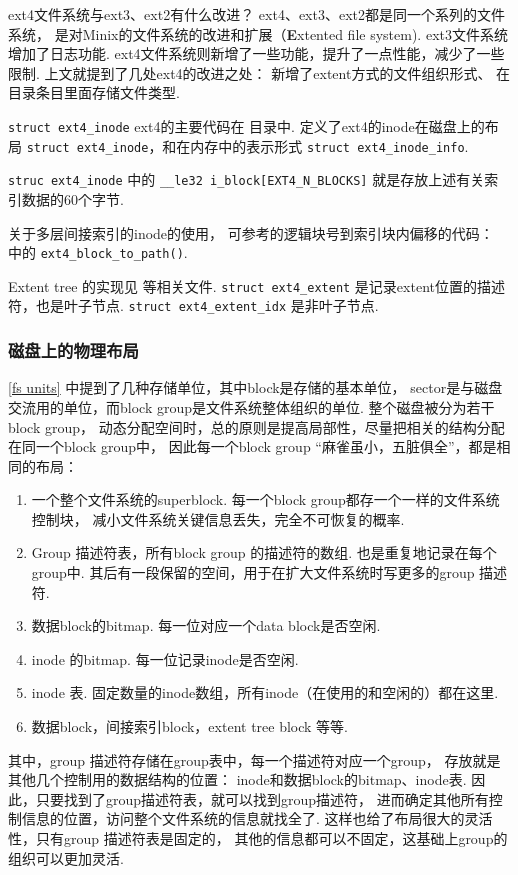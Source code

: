 \begin{qbox}{ext4文件系统与ext3、ext2有什么改进？}
	ext4、ext3、ext2都是同一个系列的文件系统，
	是对Minix的文件系统的改进和扩展（\textbf{E}xtented file system).
	ext3文件系统增加了日志功能.
	ext4文件系统则新增了一些功能，提升了一点性能，减少了一些限制.
	上文就提到了几处ext4的改进之处：
	新增了extent方式的文件组织形式、
	在目录条目里面存储文件类型.
\end{qbox}

\begin{readsrcbox}{\lstinline{struct ext4_inode}}
	ext4的主要代码在  目录中.
	 定义了ext4的inode在磁盘上的布局 \lstinline{struct ext4_inode}，和在内存中的表示形式 \lstinline{struct ext4_inode_info}.

	\lstinline{struc ext4_inode} 中的
	\lstinline{__le32 i_block[EXT4_N_BLOCKS]}
	就是存放上述有关索引数据的60个字节.

	关于多层间接索引的inode的使用，
	可参考的逻辑块号到索引块内偏移的代码：
	 中的 \lstinline{ext4_block_to_path()}.

	Extent tree 的实现见  等相关文件.
	\lstinline{struct ext4_extent} 是记录extent位置的描述符，也是叶子节点.
	\lstinline{struct ext4_extent_idx} 是非叶子节点.
\end{readsrcbox}

\subsubsection{磁盘上的物理布局}
\ref{fs units} 中提到了几种存储单位，其中block是存储的基本单位，
sector是与磁盘交流用的单位，而block group是文件系统整体组织的单位.
整个磁盘被分为若干block group，
动态分配空间时，总的原则是提高局部性，尽量把相关的结构分配在同一个block group中，
因此每一个block group “麻雀虽小，五脏俱全”，都是相同的布局\cite{ext4high}：
\begin{enumerate}
	\item 一个整个文件系统的superblock. 
	      每一个block group都存一个一样的文件系统控制块，
	      减小文件系统关键信息丢失，完全不可恢复的概率.
	\item Group 描述符表，所有block group 的描述符的数组. 
	      也是重复地记录在每个group中.
	      其后有一段保留的空间，用于在扩大文件系统时写更多的group 描述符.
	\item 数据block的bitmap. 每一位对应一个data block是否空闲.
	\item inode 的bitmap. 每一位记录inode是否空闲.
	\item inode 表.
	      固定数量的inode数组，所有inode（在使用的和空闲的）都在这里.
	\item 数据block，间接索引block，extent tree block 等等.
\end{enumerate}
其中，group 描述符存储在group表中，每一个描述符对应一个group，
存放就是其他几个控制用的数据结构的位置：
inode和数据block的bitmap、inode表.
因此，只要找到了group描述符表，就可以找到group描述符，
进而确定其他所有控制信息的位置，访问整个文件系统的信息就找全了.
这样也给了布局很大的灵活性，只有group 描述符表是固定的，
其他的信息都可以不固定，这基础上group的组织可以更加灵活.\cite{ext4global}

